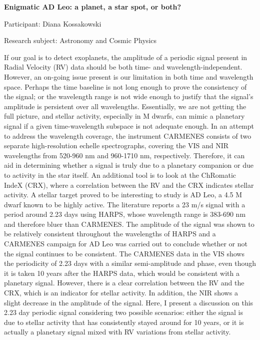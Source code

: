 \begin{minipage}[t]{1.0\textwidth}

\begin{center}

{{\large\bfseries Enigmatic AD Leo: a planet, a star spot, or both?}\par}

\end{center}

{\noindent Participant: Diana Kossakowski\par} 

{\noindent Research subject: Astronomy and Cosmic Physics\par}\medskip

\noindent If our goal is to detect exoplanets, the amplitude of a periodic signal present in Radial Velocity (RV) data should be both time- and wavelength-independent. However, an on-going issue present is our limitation in both time and wavelength space. Perhaps the time baseline is not long enough to prove the consistency of the signal; or the wavelength range is not wide enough to justify that the signal’s amplitude is persistent over all wavelengths. Essentially, we are not getting the full picture, and stellar activity, especially in M dwarfs, can mimic a planetary signal if a given time-wavelength subspace is not adequate enough. 
In an attempt to address the wavelength coverage, the instrument CARMENES consists of two separate high-resolution echelle spectrographs, covering the VIS and NIR wavelengths from 520-960 nm and 960-1710 nm, respectively. Therefore, it can aid in determining whether a signal is truly due to a planetary companion or due to activity in the star itself. An additional tool is to look at the ChRomatic IndeX (CRX), where a correlation between the RV and the CRX indicates stellar activity. 
A stellar target proved to be interesting to study is AD Leo, a 4.5 M dwarf known to be highly active. The literature reports a 23 m/s signal with a period around 2.23 days using HARPS, whose wavelength range is 383-690 nm and therefore bluer than CARMENES. The amplitude of the signal was shown to be relatively consistent throughout the wavelengths of HARPS and a CARMENES campaign for AD Leo was carried out to conclude whether or not the signal continues to be consistent. The CARMENES data in the VIS shows the periodicity of 2.23 days with a similar semi-amplitude and phase, even though it is taken 10 years after the HARPS data, which would be consistent with a planetary signal. However, there is a clear correlation between the RV and the CRX, which is an indicator for stellar activity. In addition, the NIR shows a slight decrease in the amplitude of the signal. Here, I present a discussion on this 2.23 day periodic signal considering two possible scenarios: either the signal is due to stellar activity that has consistently stayed around for 10 years, or it is actually a planetary signal mixed with RV variations from stellar activity. \par\end{minipage}

